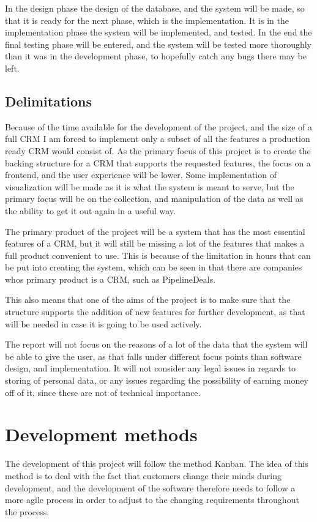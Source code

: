In the design phase the design of the database, and the system will be made, so
that it is ready for the next phase, which is the implementation. It is in the
implementation phase the system will be implemented, and tested. In the end the
final testing phase will be entered, and the system will be tested more
thoroughly than it was in the development phase, to hopefully catch any bugs
there may be left. 

\subsection{Delimitations}
\label{sub:Delimitations}
Because of the time available for the development of the project, and the size
of a full CRM I am forced to implement only a subset of all the features a
production ready CRM would consist of. As the primary focus of this project is
to create the backing structure for a CRM that supports the requested features,
the focus on a frontend, and the user experience will be lower. Some
implementation of visualization will be made as it is what the system is meant
to serve, but the primary focus will be on the collection, and manipulation of
the data as well as the ability to get it out again in a useful way. 

The primary product of the project will be a system that has the most essential
features of a CRM, but it will still be missing a lot of the features that makes
a full product convenient to use. This is because of the limitation in hours
that can be put into creating the system, which can be seen in that there are
companies whos primary product is a CRM, such as PipelineDeals. 

This also means that one of the aims of the project is to make sure that the
structure supports the addition of new features for further development, as that
will be needed in case it is going to be used actively. 

The report will not focus on the reasons of a lot of the data that the system
will be able to give the user, as that falls under different focus points than
software design, and implementation. It will not consider any legal issues in
regards to storing of personal data, or any issues regarding the possibility of
earning money off of it, since these are not of technical importance. 

\section{Development methods}
\label{sec:Development methods}
The development of this project will follow the method Kanban. The idea of this
method is to deal with the fact that customers change their minds during
development, and the development of the software therefore needs to follow a
more agile process in order to adjust to the changing requirements throughout
the process. 

